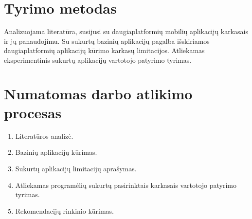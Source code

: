 \documentclass{VUMIFInfBakalaurinis}
\begin{document}
\section{Tyrimo metodas}
Analizuojama literatūra, susijusi su daugiaplatformių mobilių aplikacijų karkasais ir jų panaudojimu.
Su sukurtų bazinių aplikacijų pagalba išskiriamos daugiaplatformių aplikacijų kūrimo karkasų limitacijos.
Atliekamas eksperimentinis sukurtų aplikacijų vartotojo patyrimo tyrimas.

\section{Numatomas darbo atlikimo procesas}
\begin{enumerate}
  \item Literatūros analizė.
  \item Bazinių aplikacijų kūrimas.
  \item Sukurtų aplikacijų limitacijų aprašymas.
  \item Atliekamas programėlių sukurtų pasirinktais karkasais vartotojo patyrimo tyrimas.
  \item Rekomendacijų rinkinio kūrimas.
\end{enumerate}



\printbibliography[heading=bibintoc] %
\end{document}
